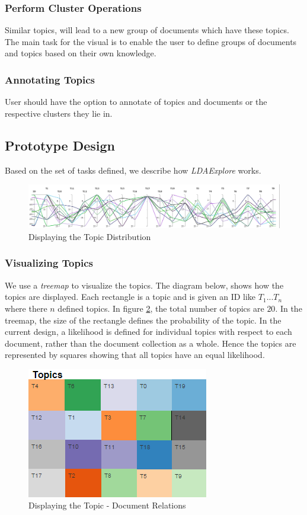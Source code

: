 \documentclass[10pt,journal,compsoc]{IEEEtran}
\begin{document}
\subsubsection{Perform Cluster Operations}
Similar topics, will lead to a new group of documents which have these topics. The main task for the visual is to enable the user to define groups of documents and topics based on their own knowledge.

\subsubsection{Annotating Topics}
User should have the option to annotate of topics and documents or the respective clusters they lie in.

\subsection{Prototype Design}
Based on the set of tasks defined, we describe how \textit{LDAExplore} works.

\begin{figure}[!t]
\centering
\includegraphics[scale=0.5]{parallel_coordinates_filter}
\caption{Displaying the Topic Distribution}
\label{top_details}
\end{figure}

\subsubsection{Visualizing Topics}
We use a \textit{treemap} to visualize the topics. The diagram below, shows how the topics are displayed. Each rectangle is a topic and is given an ID like $T_1 ... T_n$ where there $n$ defined topics. In figure \ref{top_doc}, the total number of topics are $20$. In the treemap, the size of the rectangle defines the probability of the topic. In the current design, a likelihood is defined for individual topics with respect to each document, rather than the document collection as a whole. Hence the topics are represented by squares showing that all topics have an equal likelihood.

\begin{figure}[!h]
\centering
\includegraphics[scale=0.75]{all_topics}
\caption{Displaying the Topic - Document Relations}
\label{top_doc}
\end{figure}
\end{document}
